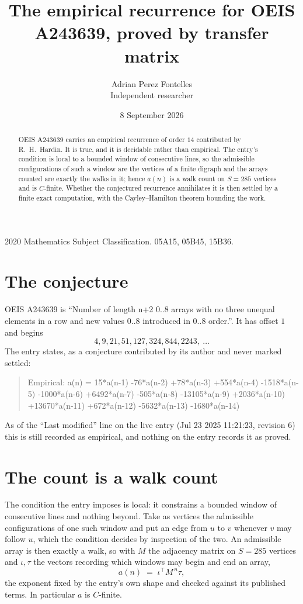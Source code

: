 \documentclass[11pt,a4paper]{article}
\title{The empirical recurrence for OEIS A243639, proved by transfer matrix}
\author{Adrian Perez Fontelles\\ \small Independent researcher}
\date{8 September 2026}
\theoremstyle{plain}
\theoremstyle{definition}
\begin{document}
\maketitle

\begin{abstract}
OEIS A243639 carries an empirical recurrence of order $14$ contributed by R.~H.~Hardin. It is
true, and it is decidable rather than empirical. The entry's condition is local to a bounded window of consecutive lines, so
the admissible configurations of such a window are the vertices of a finite digraph and the
arrays counted are exactly the walks in it; hence $a(n)$ is a walk count on $S=285$ vertices
and is $C$-finite. Whether the conjectured recurrence annihilates it is then settled by a
finite exact computation, with the Cayley--Hamilton theorem bounding the work.
\end{abstract}

\noindent\small 2020 Mathematics Subject Classification. 05A15, 05B45, 15B36.\normalsize

\section{The conjecture}

OEIS A243639 is ``Number of length n+2 0..8 arrays with no three unequal elements in a row and new values 0..8 introduced in 0..8 order.''. It has offset $1$ and begins
\[
4, 9, 21, 51, 127, 324, 844, 2243,\ \dots
\]
The entry states, as a conjecture contributed by its author and never marked settled:
\begin{quote}
Empirical: a(n) = 15*a(n-1) -76*a(n-2) +78*a(n-3) +554*a(n-4) -1518*a(n-5) -1000*a(n-6) +6492*a(n-7) -505*a(n-8) -13105*a(n-9) +2036*a(n-10) +13670*a(n-11) +672*a(n-12) -5632*a(n-13) -1680*a(n-14)
\end{quote}
As of the ``Last modified'' line on the live entry (Jul 23 2025 11:21:23, revision 6) this is still
recorded as empirical, and nothing on the entry records it as proved.

\section{The count is a walk count}

The condition the entry imposes is local: it constrains a bounded window of consecutive lines and nothing beyond. Take as
vertices the admissible configurations of one such window and put an edge from $u$ to $v$
whenever $v$ may follow $u$, which the condition decides by inspection of the two. An
admissible array is then exactly a walk, so with $M$ the adjacency matrix on $S=285$ vertices
and $\iota,\tau$ the vectors recording which windows may begin and end an array,
\[
a(n)\;=\;\iota^{\!\top}M^{\,n}\tau ,
\]
the exponent fixed by the entry's own shape and checked against its published terms. In
particular $a$ is $C$-finite.
\end{document}

